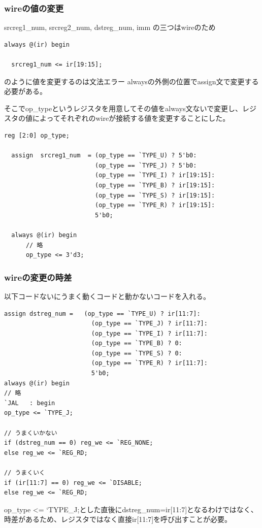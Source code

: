 \documentclass[a4paper,11pt]{jsarticle}
\begin{document}
\subsubsection{wireの値の変更}
srcreg1\_num, srcreg2\_num, dstreg\_num, imm の三つはwireのため
\begin{lstlisting}[style={verilog-style}]
  always @(ir) begin

  srcreg1_num <= ir[19:15];\end{lstlisting}

  のように値を変更するのは文法エラー
  alwaysの外側の位置でassign文で変更する必要がある。

  そこでop\_typeというレジスタを用意してその値をalways文ないで変更し、レジスタの値によってそれぞれのwireが接続する値を変更することにした。
\begin{lstlisting}[style={verilog-style}]
  reg [2:0] op_type;

  assign  srcreg1_num  = (op_type == `TYPE_U) ? 5'b0:
                         (op_type == `TYPE_J) ? 5'b0:
                         (op_type == `TYPE_I) ? ir[19:15]:
                         (op_type == `TYPE_B) ? ir[19:15]:
                         (op_type == `TYPE_S) ? ir[19:15]:
                         (op_type == `TYPE_R) ? ir[19:15]:
                         5'b0;   
  
  always @(ir) begin
      // 略
      op_type <= 3'd3;\end{lstlisting}


\subsubsection{wireの変更の時差}
以下コードないにうまく動くコードと動かないコードを入れる。
\begin{lstlisting}[style={verilog-style}]
  assign dstreg_num =   (op_type == `TYPE_U) ? ir[11:7]:
                        (op_type == `TYPE_J) ? ir[11:7]:
                        (op_type == `TYPE_I) ? ir[11:7]:
                        (op_type == `TYPE_B) ? 0:
                        (op_type == `TYPE_S) ? 0:
                        (op_type == `TYPE_R) ? ir[11:7]:
                        5'b0;
always @(ir) begin
// 略
`JAL   : begin
op_type <= `TYPE_J;

// うまくいかない
if (dstreg_num == 0) reg_we <= `REG_NONE;
else reg_we <= `REG_RD;

// うまくいく
if (ir[11:7] == 0) reg_we <= `DISABLE;
else reg_we <= `REG_RD;\end{lstlisting}
op\_type <= `TYPE\_J;とした直後にdstreg\_num=ir[11:7]となるわけではなく、時差があるため、レジスタではなく直接ir[11:7]を呼び出すことが必要。
\end{document}
